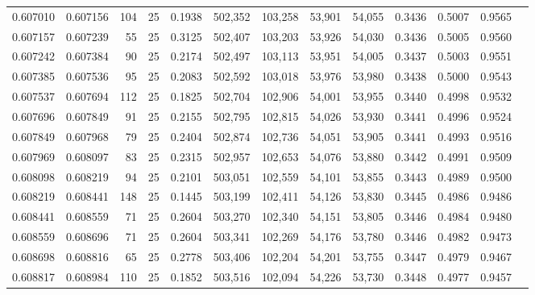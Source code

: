 \begin{tabular}{rrrrrrrrrrrrr}
0.607010 & 0.607156 &   104 &  25 &                                     0.1938 & 502,352 & 103,258 &  53,901 &  54,055 & 0.3436 & 0.5007 & 0.9565 \\
0.607157 & 0.607239 &    55 &  25 &                                     0.3125 & 502,407 & 103,203 &  53,926 &  54,030 & 0.3436 & 0.5005 & 0.9560 \\
0.607242 & 0.607384 &    90 &  25 &                                     0.2174 & 502,497 & 103,113 &  53,951 &  54,005 & 0.3437 & 0.5003 & 0.9551 \\
0.607385 & 0.607536 &    95 &  25 &                                     0.2083 & 502,592 & 103,018 &  53,976 &  53,980 & 0.3438 & 0.5000 & 0.9543 \\
0.607537 & 0.607694 &   112 &  25 &                                     0.1825 & 502,704 & 102,906 &  54,001 &  53,955 & 0.3440 & 0.4998 & 0.9532 \\
0.607696 & 0.607849 &    91 &  25 &                                     0.2155 & 502,795 & 102,815 &  54,026 &  53,930 & 0.3441 & 0.4996 & 0.9524 \\
0.607849 & 0.607968 &    79 &  25 &                                     0.2404 & 502,874 & 102,736 &  54,051 &  53,905 & 0.3441 & 0.4993 & 0.9516 \\
0.607969 & 0.608097 &    83 &  25 &                                     0.2315 & 502,957 & 102,653 &  54,076 &  53,880 & 0.3442 & 0.4991 & 0.9509 \\
0.608098 & 0.608219 &    94 &  25 &                                     0.2101 & 503,051 & 102,559 &  54,101 &  53,855 & 0.3443 & 0.4989 & 0.9500 \\
0.608219 & 0.608441 &   148 &  25 &                                     0.1445 & 503,199 & 102,411 &  54,126 &  53,830 & 0.3445 & 0.4986 & 0.9486 \\
0.608441 & 0.608559 &    71 &  25 &                                     0.2604 & 503,270 & 102,340 &  54,151 &  53,805 & 0.3446 & 0.4984 & 0.9480 \\
0.608559 & 0.608696 &    71 &  25 &                                     0.2604 & 503,341 & 102,269 &  54,176 &  53,780 & 0.3446 & 0.4982 & 0.9473 \\
0.608698 & 0.608816 &    65 &  25 &                                     0.2778 & 503,406 & 102,204 &  54,201 &  53,755 & 0.3447 & 0.4979 & 0.9467 \\
0.608817 & 0.608984 &   110 &  25 &                                     0.1852 & 503,516 & 102,094 &  54,226 &  53,730 & 0.3448 & 0.4977 & 0.9457 \\

\end{tabular}
